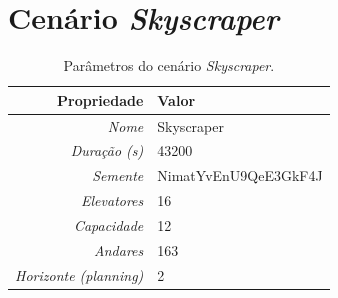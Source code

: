 \section{Cenário \textit{Skyscraper}}

\lipsum[1]

\begin{table}[htb!]
\centering
\caption{Parâmetros do cenário \textit{Skyscraper}.}
\label{tab:results:skyscraper:params}
\begin{tabular}{|r|l|}
\hline
\textbf{Propriedade}          & \textbf{Valor}       \\ \hline
\textit{Nome}                 & Skyscraper           \\ \hline
\textit{Duração (s)}          & 43200                \\ \hline
\textit{Semente}              & NimatYvEnU9QeE3GkF4J \\ \hline
\textit{Elevatores}           & 16                   \\ \hline
\textit{Capacidade}           & 12                   \\ \hline
\textit{Andares}              & 163                  \\ \hline
\textit{Horizonte (planning)} & 2                    \\ \hline
\end{tabular}
\end{table}

